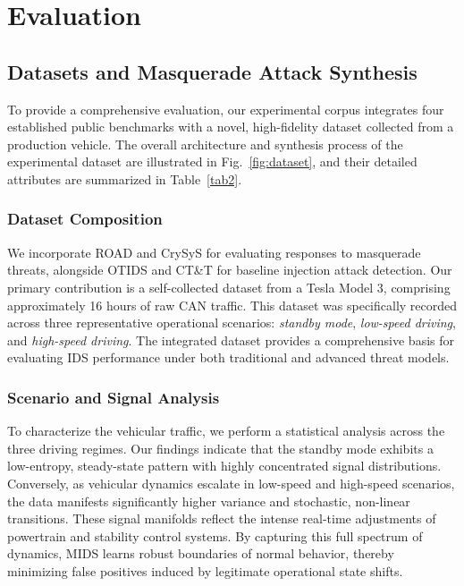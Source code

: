 \documentclass[lettersize,journal]{IEEEtran}
\begin{document}
\section{Evaluation}
\label{sec:experiments}

\subsection{Datasets and Masquerade Attack Synthesis}
\label{sec:dataset_design}

To provide a comprehensive evaluation, our experimental corpus integrates four established public benchmarks with a novel, high-fidelity dataset collected from a production vehicle. The overall architecture and synthesis process of the experimental dataset are illustrated in Fig.~\ref{fig:dataset}, and their detailed attributes are summarized in Table~\ref{tab2}.

\subsubsection{Dataset Composition} We incorporate ROAD and CrySyS for evaluating responses to masquerade threats, alongside OTIDS and CT\&T for baseline injection attack detection. Our primary contribution is a self-collected dataset from a Tesla Model 3, comprising approximately 16 hours of raw CAN traffic. This dataset was specifically recorded across three representative operational scenarios: \textit{standby mode}, \textit{low-speed driving}, and \textit{high-speed driving}. The integrated dataset provides a comprehensive basis for evaluating IDS performance under both traditional and advanced threat models.

\subsubsection{Scenario and Signal Analysis} To characterize the vehicular traffic, we perform a statistical analysis across the three driving regimes. Our findings indicate that the standby mode exhibits a low-entropy, steady-state pattern with highly concentrated signal distributions. Conversely, as vehicular dynamics escalate in low-speed and high-speed scenarios, the data manifests significantly higher variance and stochastic, non-linear transitions. These signal manifolds reflect the intense real-time adjustments of powertrain and stability control systems. By capturing this full spectrum of dynamics, MIDS learns robust boundaries of normal behavior, thereby minimizing false positives induced by legitimate operational state shifts.
\end{document}
